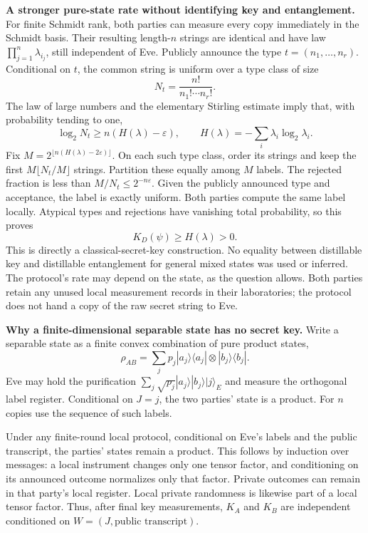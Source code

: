\documentclass[11pt]{article}
\begin{document}
\textbf{A stronger pure-state rate without identifying key and entanglement.}
For finite Schmidt rank, both parties can measure every copy immediately in
the Schmidt basis.  Their resulting length-$n$ strings are identical and
have law $\prod_{j=1}^n\lambda_{i_j}$, still independent of Eve.  Publicly
announce the type $t=(n_1,\ldots,n_r)$.  Conditional on $t$, the common string
is uniform over a type class of size
\[
 N_t=\frac{n!}{n_1!\cdots n_r!}.
\]
The law of large numbers and the elementary Stirling estimate imply that,
with probability tending to one,
\[
 \log_2N_t\geq n(H(\lambda)-\varepsilon),\qquad
 H(\lambda)=-\sum_i\lambda_i\log_2\lambda_i.
\]
Fix $M=2^{\lfloor n(H(\lambda)-2\varepsilon)\rfloor}$.
On each such type class, order its strings and keep the first
$M\lfloor N_t/M\rfloor$ strings.  Partition these equally among $M$ labels.
The rejected fraction is less than $M/N_t\leq2^{-n\varepsilon}$.
Given the publicly announced type and acceptance, the label is exactly
uniform.  Both parties compute the same label locally.  Atypical types and
rejections have vanishing total probability, so this proves
\[
 K_D(\psi)\geq H(\lambda)>0.
\]
This is directly a classical-secret-key construction.  No equality between
distillable key and distillable entanglement for general mixed states was
used or inferred.  The protocol's rate may depend on the state, as the
question allows.  Both parties retain any unused local measurement records
in their laboratories; the protocol does not hand a copy of the raw secret
string to Eve.

\textbf{Why a finite-dimensional separable state has no secret key.}
Write a separable state as a finite convex combination of pure product states,
\[
 \rho_{AB}=\sum_jp_j|a_j\rangle\langle a_j|
                         \otimes|b_j\rangle\langle b_j|.
\]
Eve may hold the purification
$\sum_j\sqrt{p_j}|a_j\rangle|b_j\rangle|j\rangle_E$ and measure the
orthogonal label register.  Conditional on $J=j$, the two parties' state is
a product.  For $n$ copies use the sequence of such labels.

Under any finite-round local protocol, conditional on Eve's labels and the
public transcript, the parties' states remain a product.  This follows by
induction over messages: a local instrument changes only one tensor factor,
and conditioning on its announced outcome normalizes only that factor.
Private outcomes can remain in that party's local register.  Local private
randomness is likewise part of a local tensor factor.  Thus, after final key
measurements, $K_A$ and $K_B$ are independent conditioned on
$W=(J,\text{public transcript})$.
\end{document}
